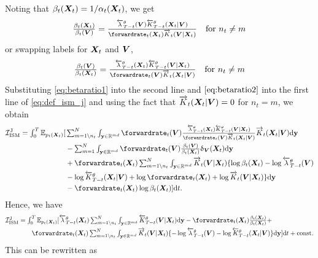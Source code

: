 Noting that $\beta_t({\bm{X}}_t) = 1 / \alpha_t({\bm{X}}_t)$, we get 
\begin{equation}
    \textstyle \frac{\beta_t ( \mX_t)}{\beta_t(\mV)} = \frac{\backwardrate_{T-t}^\theta (\mV) \btk_{T-t}^\theta(\mX_t | \mV)}{\forwardrate_t(\mX_t) \ftk_t(\mV | \mX_t)} \quad \text{for } n_t \neq m
    \label{eq:betaratio1}
\end{equation}
or swapping labels for ${\bm{X}}_t$ and ${\bm{V}}$,
\begin{equation}
    \textstyle \frac{\beta_t ( \mV)}{\beta_t(\mX_t)} = \frac{\backwardrate_{T-t}^\theta (\mX_t) \btk_{T-t}^\theta(\mV | \mX_t)}{\forwardrate_t(\mV) \ftk_t(\mX_t | \mV)} \quad \text{for } n_t \neq m
    \label{eq:betaratio2}
\end{equation}
Substituting \eqref{eq:betaratio1} into the second line and
$\eqref{eq:betaratio2}$ into the first line of \eqref{eq:def_ism_j} and using
the fact that $\overrightarrow{K}_t({\bm{X}}_t | {\bm{V}}) = 0$ for $n_t = m$, we obtain
\begin{align}
    \mathcal{I}_{\text{ISM}}^{\text{J}} = \textstyle \int_0^T \mathbb{E}_{p_t(\mX_t)} [&\textstyle  \intyNont \forwardrate_t(\mV)  \frac{\backwardrate_{T-t}^\theta (\mX_t) \btk_{T-t}^\theta(\mV | \mX_t)}{\forwardrate_t(\mV) \ftk_t(\mX_t | \mV)} \ftk_t(\mX_t | \mV) \rmd \y \\
    &\textstyle - \inty \forwardrate_t(\mV) \frac{\beta_t(\mV)}{\beta_t(\mX_t)} \updelta_{\mV} (\mX_t)  \rmd\y \\
    &\textstyle +\forwardrate_t(\mX_t) \intyNont \ftk_t(\mV | \mX_t) \{ \log \beta_t(\mX_t) - \log \backwardrate_{T-t}^\theta(\mV) \\ & \textstyle - \log \btk_{T-t}^\theta(\mX_t | \mV) 
    \textstyle   + \log \forwardrate_t(\mX_t) + \log \ftk_t(\mV | \mX_t)  \} \rmd \y \\
    &\textstyle - \forwardrate_t(\mX_t) \log \beta_t(\mX_t)] \rmd t . 
\end{align}
Hence, we have 
\begin{align}
  \textstyle 
    \mathcal{I}_{\text{ISM}}^{\text{J}} &\textstyle = \int_{0}^T \mathbb{E}_{p_t(\mX_t)} [\textstyle  \backwardrate_{T-t}^\theta(\mX_t) \intyNont \btk_{T-t}^\theta(\mV | \mX_t) \rmd\y - \forwardrate_t(\mX_t) \frac{\beta_t(\mX_t)}{\beta_t(\mX_t)}  + \\
    & \qquad\textstyle \forwardrate_t(\mX_t) \intyNont \ftk_t(\mV | \mX_t) \{ -\log \backwardrate_{T-t}^\theta(\mV) - \log \btk_{T-t}^\theta(\mX_t | \mV) \} \rmd \y ] \rmd t + \text{const} .
\end{align}
This can be rewritten as 
